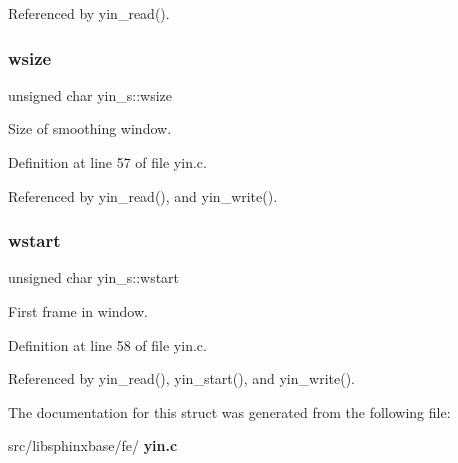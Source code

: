 Referenced by yin\+\_\+read().

\mbox{\label{structyin__s_a024d8e9d70f94a7f62457154fb5a4b03}} 
\subsubsection{wsize}
{\footnotesize\ttfamily unsigned char yin\+\_\+s\+::wsize}



Size of smoothing window. 



Definition at line 57 of file yin.\+c.



Referenced by yin\+\_\+read(), and yin\+\_\+write().

\mbox{\label{structyin__s_a18481851da6db4df2a469b80c2c5704e}} 
\subsubsection{wstart}
{\footnotesize\ttfamily unsigned char yin\+\_\+s\+::wstart}



First frame in window. 



Definition at line 58 of file yin.\+c.



Referenced by yin\+\_\+read(), yin\+\_\+start(), and yin\+\_\+write().



The documentation for this struct was generated from the following file\+:\begin{DoxyCompactItemize}
\item 
src/libsphinxbase/fe/\textbf{ yin.\+c}\end{DoxyCompactItemize}

